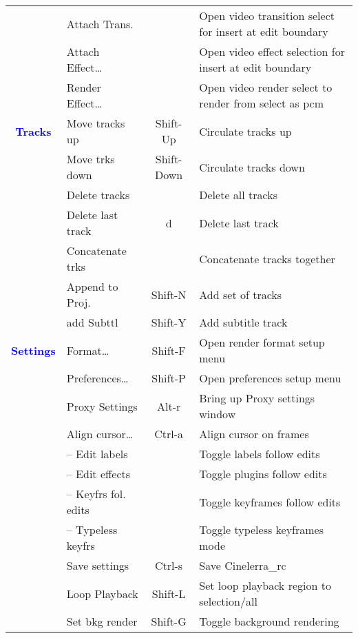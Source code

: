 \begin{center}
\begin{longtable}{>{\bfseries}c l c p{6cm}}
             & Attach Trans. &  & Open video transition select for insert at edit boundary \\             
             & Attach Effect\dots &  & Open video effect selection for insert at edit boundary \\             
             & Render Effect\dots &  & Open video render select to render from select as pcm \\
             \midrule
          \textcolor{blue}{Tracks} & Move tracks up & Shift-Up & Circulate tracks up \\             
             & Move trks down & Shift-Down & Circulate tracks down \\             
             & Delete tracks &  & Delete all tracks \\             
             & Delete last track & d & Delete last track \\             
             & Concatenate trks &  & Concatenate tracks together \\             
             & Append to Proj.	 & Shift-N & Add set of tracks \\             
             & add Subttl & Shift-Y & Add subtitle track \\             
             \midrule
          \textcolor{blue}{Settings} & Format\dots & Shift-F & Open render format setup menu \\             
             & Preferences\dots & Shift-P & Open preferences setup menu \\             
             & Proxy Settings & Alt-r & Bring up Proxy settings window \\             
             & Align cursor\dots & Ctrl-a & Align cursor on frames \\             
             & -- Edit labels &  & Toggle labels follow edits \\             
             & -- Edit effects &  & Toggle plugins follow edits \\             
             & -- Keyfrs fol. edits &  & Toggle keyframes follow edits \\             
             & -- Typeless keyfrs &  & Toggle typeless keyframes mode \\             
             & Save settings & Ctrl-s & Save Cinelerra\_rc \\             
             & Loop Playback & Shift-L & Set loop playback region to selection/all \\             
             & Set bkg render & Shift-G & Toggle background rendering \\

\end{longtable}
\end{center}
